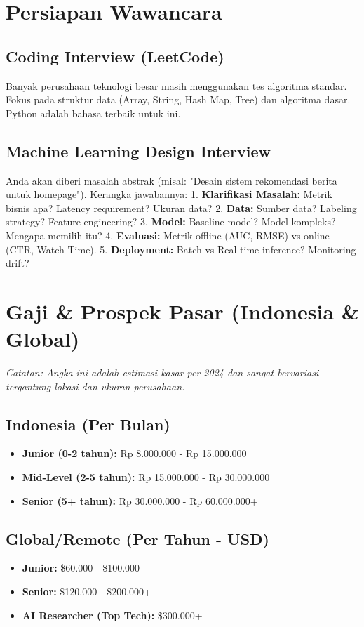 \section{Persiapan Wawancara}

\subsection{Coding Interview (LeetCode)}
Banyak perusahaan teknologi besar masih menggunakan tes algoritma standar. Fokus pada struktur data (Array, String, Hash Map, Tree) dan algoritma dasar. Python adalah bahasa terbaik untuk ini.

\subsection{Machine Learning Design Interview}
Anda akan diberi masalah abstrak (misal: "Desain sistem rekomendasi berita untuk homepage"). Kerangka jawabannya:
1. \textbf{Klarifikasi Masalah:} Metrik bisnis apa? Latency requirement? Ukuran data?
2. \textbf{Data:} Sumber data? Labeling strategy? Feature engineering?
3. \textbf{Model:} Baseline model? Model kompleks? Mengapa memilih itu?
4. \textbf{Evaluasi:} Metrik offline (AUC, RMSE) vs online (CTR, Watch Time).
5. \textbf{Deployment:} Batch vs Real-time inference? Monitoring drift?

\section{Gaji \& Prospek Pasar (Indonesia \& Global)}
\textit{Catatan: Angka ini adalah estimasi kasar per 2024 dan sangat bervariasi tergantung lokasi dan ukuran perusahaan.}

\subsection{Indonesia (Per Bulan)}
\begin{itemize}
    \item \textbf{Junior (0-2 tahun):} Rp 8.000.000 - Rp 15.000.000
    \item \textbf{Mid-Level (2-5 tahun):} Rp 15.000.000 - Rp 30.000.000
    \item \textbf{Senior (5+ tahun):} Rp 30.000.000 - Rp 60.000.000+
\end{itemize}

\subsection{Global/Remote (Per Tahun - USD)}
\begin{itemize}
    \item \textbf{Junior:} \$60.000 - \$100.000
    \item \textbf{Senior:} \$120.000 - \$200.000+
    \item \textbf{AI Researcher (Top Tech):} \$300.000+
\end{itemize}

